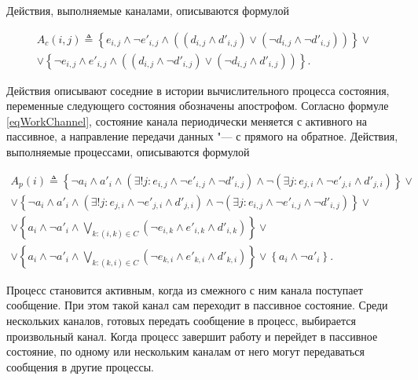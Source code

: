 Действия, выполняемые каналами, описываются формулой

\begin{multline}

A_{c}\left(i,j\right)\triangleq\left\{e_{i,j}\wedge\neg e'_{i,j}\wedge\left(\left(d_{i,j}\wedge d'_{i,j}\right)\vee\left(\neg d_{i,j}\wedge\neg d'_{i,j}\right)\right)\right\}\vee\\

\vee\left\{\neg e_{i,j}\wedge e'_{i,j}\wedge\left(\left(d_{i,j}\wedge\neg d'_{i,j}\right)\vee\left(\neg d_{i,j}\wedge d'_{i,j}\right)\right)\right\}.

\label{eqWorkChannel}

\end{multline}



Действия описывают соседние в истории вычислительного процесса состояния, переменные следующего состояния обозначены апострофом. Согласно формуле \eqref{eqWorkChannel}, состояние канала периодически меняется с активного на пассивное, а направление передачи данных "--- с прямого на обратное. Действия, выполняемые процессами, описываются формулой 

\begin{multline}

A_{p}\left(i\right)\triangleq\left\{\neg a_{i}\wedge a'_{i}\wedge\left(\exists !j\colon e_{i,j}\wedge\neg e'_{i,j}\wedge\neg d'_{i,j}\right)\wedge\neg\left(\exists j\colon e_{j,i}\wedge\neg e'_{j,i}\wedge d'_{j,i}\right)\right\}\vee\\

\vee\left\{\neg a_{i}\wedge a'_{i}\wedge\left(\exists !j\colon e_{j,i}\wedge\neg e'_{j,i}\wedge d'_{j,i}\right)\wedge\neg\left(\exists j\colon e_{i,j}\wedge\neg e'_{i,j}\wedge\neg d'_{i,j}\right)\right\}\vee\\

\vee\left\{a_{i}\wedge\neg a'_{i}\wedge\bigvee_{k\colon\left(i,k\right)\in C}\left(\neg e_{i,k}\wedge e'_{i,k}\wedge d'_{i,k}\right)\right\}\vee\\

\vee\left\{a_{i}\wedge\neg a'_{i}\wedge\bigvee_{k\colon\left(k,i\right)\in C}\left(\neg e_{k,i}\wedge e'_{k,i}\wedge d'_{k,i}\right)\right\}\vee\left\{a_{i}\wedge\neg a'_{i}\right\}.

\label{eqWorkProcess}

\end{multline}



Процесс становится активным, когда из смежного с ним канала поступает сообщение. При этом такой канал сам переходит в пассивное состояние. Среди нескольких каналов, готовых передать сообщение в процесс, выбирается произвольный канал. Когда процесс завершит работу и перейдет в пассивное состояние, по одному или нескольким каналам от него могут передаваться сообщения в другие процессы.



